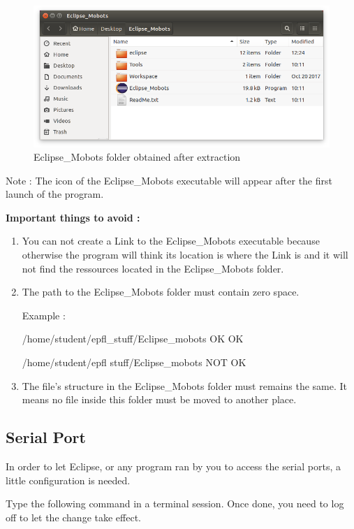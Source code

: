 \documentclass[a4paper]{article}
\begin{document}
\begin{figure}[!h]
\centering
\includegraphics[width=1\columnwidth]{fig/Eclipse_Mobots_Folder_Linux}
\caption{Eclipse\_Mobots folder obtained after extraction}
\label{fig:Eclipse_Mobots_Folder_Linux}
\end{figure}

Note : The icon of the Eclipse\_Mobots executable will appear after the first launch of the program.

\textbf{Important things to avoid :}

\begin{enumerate}
\item You can not create a Link to the Eclipse\_Mobots executable because otherwise the program will think its location is where the Link is and it will not find the ressources located in the Eclipse\_Mobots folder.
\item The path to the Eclipse\_Mobots folder must contain zero space. 

Example :

/home/student/epfl\_stuff/Eclipse\_mobots OK   OK

/home/student/epfl stuff/Eclipse\_mobots NOT OK

\item The file's structure in the Eclipse\_Mobots folder must remains the same. It means no file inside this folder must be moved to another place.
\end{enumerate}

\subsection{Serial Port}

In order to let Eclipse, or any program ran by you to access the serial ports, a little configuration is needed.

Type the following command in a terminal session. Once done, you need to log off to let the change take effect.
\end{document}

